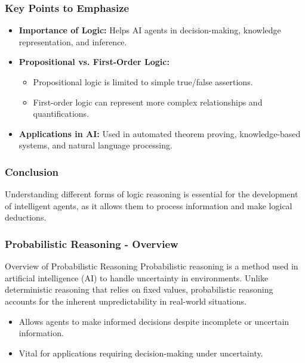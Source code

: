 \documentclass[aspectratio=169]{beamer}
\begin{document}
\begin{frame}[fragile]
    \frametitle{Key Points to Emphasize}
    \begin{itemize}
        \item \textbf{Importance of Logic:} Helps AI agents in decision-making, knowledge representation, and inference.
        \item \textbf{Propositional vs. First-Order Logic:} 
            \begin{itemize}
                \item Propositional logic is limited to simple true/false assertions.
                \item First-order logic can represent more complex relationships and quantifications.
            \end{itemize}
        \item \textbf{Applications in AI:} Used in automated theorem proving, knowledge-based systems, and natural language processing.
    \end{itemize}
\end{frame}

\begin{frame}[fragile]
    \frametitle{Conclusion}
    Understanding different forms of logic reasoning is essential for the development of intelligent agents, as it allows them to process information and make logical deductions.
\end{frame}

\begin{frame}[fragile]
    \frametitle{Probabilistic Reasoning - Overview}
    \begin{block}{Overview of Probabilistic Reasoning}
        Probabilistic reasoning is a method used in artificial intelligence (AI) to handle uncertainty in environments. Unlike deterministic reasoning that relies on fixed values, probabilistic reasoning accounts for the inherent unpredictability in real-world situations.
    \end{block}
    \begin{itemize}
        \item Allows agents to make informed decisions despite incomplete or uncertain information.
        \item Vital for applications requiring decision-making under uncertainty.
    \end{itemize}
\end{frame}
\end{document}
